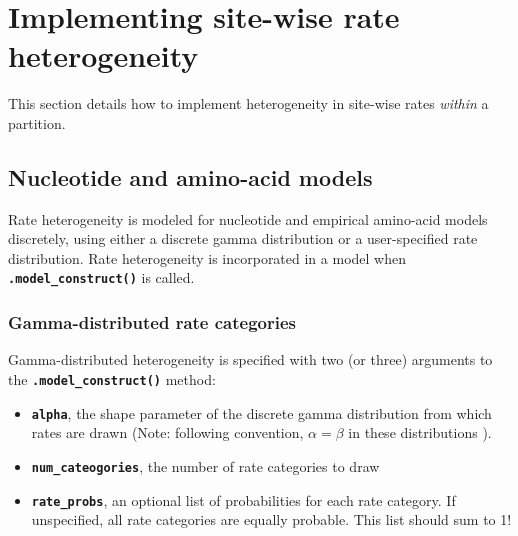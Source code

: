 \documentclass{article}
\newcommand{\code}[1]{\textbf{\texttt{\small{#1}}}}
\begin{document}

















\section{Implementing site-wise rate heterogeneity}\label{sec:sitehet}

This section details how to implement heterogeneity in site-wise rates \emph{within} a partition.


\subsection{Nucleotide and amino-acid models}

Rate heterogeneity is modeled for nucleotide and empirical amino-acid models discretely, using either a discrete gamma distribution or a user-specified rate distribution. Rate heterogeneity is incorporated in a model when \code{.model\_construct()} is called. 

\subsubsection{Gamma-distributed rate categories}

Gamma-distributed heterogeneity is specified with two (or three) arguments to the \code{.model\_construct()} method:
\begin{itemize}
	\item \code{alpha}, the shape parameter of the discrete gamma distribution from which rates are drawn (Note: following convention, $\alpha = \beta$ in these distributions \citep{Yang2006}).
	\item \code{num\_cateogories}, the number of rate categories to draw
	\item \code{rate\_probs}, an optional list of probabilities for each rate category. If unspecified, all rate categories are equally probable. This list should sum to 1!
\end{itemize}
\end{document}
